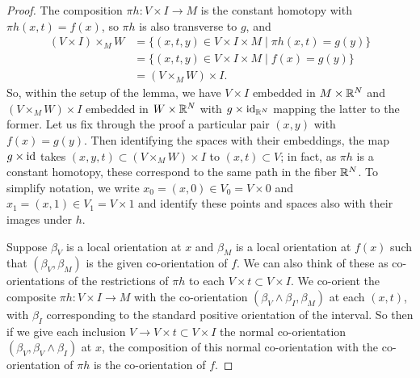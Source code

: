 \begin{proof}
	The composition $\pi h \colon V \times I \to M$ is the constant homotopy with $\pi h(x,t) = f(x)$, so $\pi h$ is also transverse to $g$, and
	\begin{align*}
		(V \times I) \times_M W
		&= \{ (x,t,y)\in V \times I \times M \mid \pi h(x,t) = g(y) \} \\
		&= \{ (x,t,y)\in V \times I \times M \mid f(x) = g(y) \} \\
		&= (V \times_M W) \times I.
	\end{align*}
	So, within the setup of the lemma, we have $V \times I$ embedded in $M \times \mathbb{R}^N$ and $(V \times_M W) \times I$ embedded in $W \times \mathbb{R}^N$ with $g \times \mathrm{id}_{\mathbb{R}^N}$ mapping the latter to the former.
	Let us fix through the proof a particular pair $(x,y)$ with $f(x) = g(y)$.
	Then identifying the spaces with their embeddings, the map $g \times \mathrm{id}$ takes $(x,y,t) \subset (V \times_M W) \times I$ to $(x,t) \subset V$; in fact, as $\pi h$ is a constant homotopy, these correspond to the same path in the fiber $\mathbb{R}^N$.
	To simplify notation, we write $x_0 = (x,0) \in V_0= V \times 0$ and $x_1 = (x,1) \in V_1 = V \times 1$ and identify these points and spaces also with their images under $h$.

	Suppose $\beta_V$ is a local orientation at $x$ and $\beta_M$ is a local orientation at $f(x)$ such that $(\beta_V,\beta_M)$ is the given co-orientation of $f$.
	We can also think of these as co-orientations of the restrictions of $\pi h$ to each $V \times t \subset V \times I$.
	We co-orient the composite $\pi h \colon V \times I \to M$ with the co-orientation $(\beta_V \wedge \beta_I, \beta_M)$ at each $(x,t)$, with $\beta_I$ corresponding to the standard positive orientation of the interval.
	So then if we give each inclusion $V \to V \times t \subset V \times I$ the normal co-orientation $(\beta_V, \beta_V \wedge \beta_I)$ at $x$, the composition of this normal co-orientation with the co-orientation of $\pi h$ is the co-orientation of $f$.


\end{proof}
